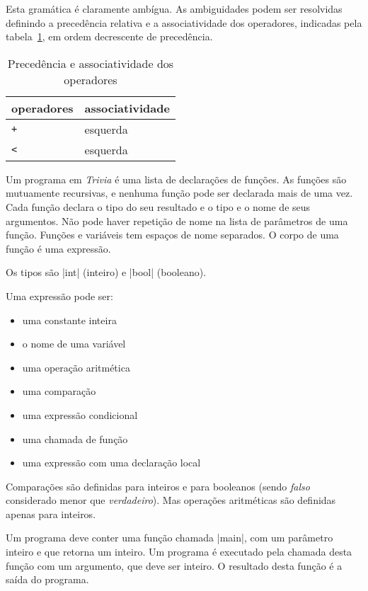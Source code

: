 \documentclass[a4paper,11pt,brazil]{article}
\newcommand{\lang}{\textsl{Trivia}}
\begin{document}
Esta gramática é claramente ambígua. As ambiguidades podem ser
resolvidas definindo a precedência relativa e a associatividade dos
operadores, indicadas pela tabela~\ref{tab:prec}, em ordem decrescente
de precedência.

\begin{table}[!htb]
  \centering
  \begin{tabular}{|l|l|}\hline
    \textbf{operadores} & \textbf{associatividade} \\\hline
    \texttt{+}          & esquerda                 \\\hline
    \texttt{<}          & esquerda                 \\\hline
  \end{tabular}
  \caption{Precedência e associatividade dos operadores}
  \label{tab:prec}
\end{table}

Um programa em \lang{} é uma lista de declarações de funções. As
funções são mutuamente recursivas, e nenhuma função pode ser declarada
mais de uma vez. Cada função declara o tipo do seu resultado e o tipo
e o nome de seus argumentos. Não pode haver repetição de nome na lista
de parâmetros de uma função. Funções e variáveis tem espaços de nome
separados. O corpo de uma função é uma expressão.

Os tipos são \pyginline|int| (inteiro) e \pyginline|bool| (booleano).

Uma expressão pode ser:
\begin{itemize}
  \item uma constante inteira
  \item o nome de uma variável
  \item uma operação aritmética
  \item uma comparação
  \item uma expressão condicional
  \item uma chamada de função
  \item uma expressão com uma declaração local
\end{itemize}

Comparações são definidas para inteiros e para booleanos (sendo
\emph{falso} considerado menor que \emph{verdadeiro}). Mas operações
aritméticas são definidas apenas para inteiros.

Um programa deve conter uma função chamada \pyginline|main|, com um
parâmetro inteiro e que retorna um inteiro. Um programa é executado
pela chamada desta função com um argumento, que deve ser inteiro. O
resultado desta função é a saída do programa.
\end{document}

